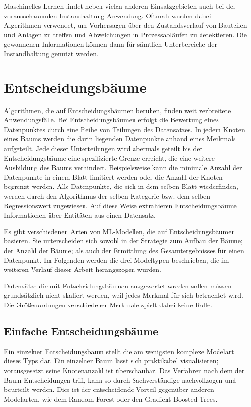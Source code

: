 Maschinelles Lernen findet neben vielen anderen Einsatzgebieten auch bei der vorausschauenden Instandhaltung Anwendung. Oftmals werden dabei Algorithmen verwendet, um Vorhersagen über den Zustandsverlauf von Bauteilen und Anlagen zu treffen und Abweichungen in Prozessabläufen zu detektieren. Die gewonnenen Informationen können dann für sämtlich Unterbereiche der Instandhaltung genutzt werden.

\section{Entscheidungsbäume}
\label{sec:entscheidungsbaeume}
Algorithmen, die auf Entscheidungsbäumen beruhen, finden weit verbreitete Anwendungsfälle. Bei Entscheidungsbäumen erfolgt die Bewertung eines Datenpunktes durch eine Reihe von Teilungen des Datensatzes. In jedem Knoten eines Baums werden die darin liegenden Datenpunkte anhand eines Merkmals aufgeteilt. Jede dieser Unterteilungen wird abermals geteilt bis der Entscheidungsbäume eine spezifizierte Grenze erreicht, die eine weitere Ausbildung des Baums verhindert. Beispielsweise kann die minimale Anzahl der Datenpunkte in einem Blatt limitiert werden oder die Anzahl der Knoten begrenzt werden. Alle Datenpunkte, die sich in dem selben Blatt wiederfinden, werden durch den Algorithmus der selben Kategorie bzw. dem selben Regressionswert zugewiesen.  Auf diese Weise extrahieren Entscheidungsbäume Informationen über Entitäten aus einen Datensatz.

Es gibt verschiedenen Arten von ML-Modellen, die auf Entscheidungsbäumen basieren. Sie unterscheiden sich sowohl in der Strategie zum Aufbau der Bäume; der Anzahl der Bäume; als auch der Ermittlung des Gesamtergebnisses für einen Datenpunkt. Im Folgenden werden die drei Modeltypen beschrieben, die im weiteren Verlauf dieser Arbeit herangezogen wurden.

Datensätze die mit Entscheidungsbäumen ausgewertet wreden sollen müssen grundsätzlich nicht skaliert werden, weil jedes Merkmal für sich betrachtet wird. Die Größenordungen verschiedener Merkmale spielt dabei keine Rolle.

\subsection{Einfache Entscheidungsbäume}
\label{subsec:einfache_entscheidungsbaeume}
Ein einzelner Entscheidungsbaum stellt die am wenigsten komplexe Modelart dieses Typs dar. Ein einzelner Baum lässt sich praktikabel visualisieren; vorausgesetzt seine Knotenanzahl ist überschaubar. Das Verfahren nach dem der Baum Entscheidungen triff, kann so durch Sachverständige nachvollzogen und beurteilt werden. Dies ist der entscheidende Vorteil gegenüber anderen Modelarten, wie dem Random Forest oder den Gradient Boosted Trees.

